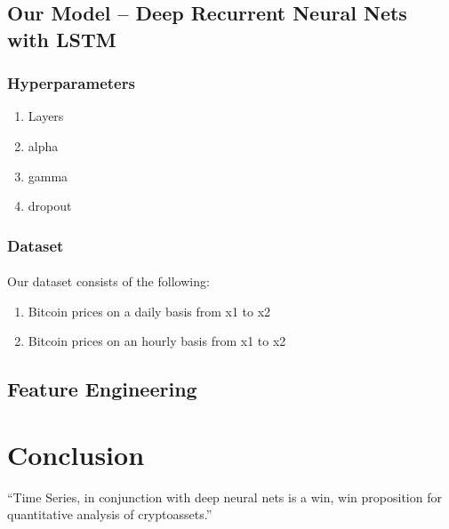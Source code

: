 \documentclass{article}
\begin{document}
\subsection{Our Model – Deep Recurrent Neural Nets with LSTM}
\subsubsection{Hyperparameters}
\begin{enumerate}
    \item Layers
    \item alpha
    \item gamma
    \item dropout
\end{enumerate}
\subsubsection{Dataset}
\paragraph{}
Our dataset consists of the following:
\begin{enumerate}
    \item Bitcoin prices on a daily basis from x1 to x2
    \item Bitcoin prices on an hourly basis from x1 to x2
\end{enumerate}


\subsection{Feature Engineering}


\section{Conclusion}
``Time Series, in conjunction with deep neural nets is a win, win proposition for quantitative analysis of cryptoassets.'' \citep{adams1995hitchhiker}



\end{document}

